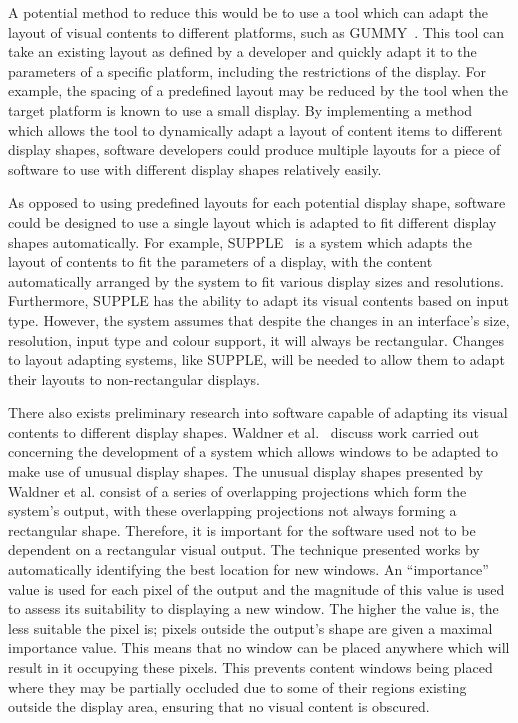 \documentclass[twocolumn,compsoc]{cvm}
\begin{document}
A potential method to reduce this would be to use a tool which can adapt the layout of visual contents to different platforms, such as GUMMY~\cite{Meskens2008}.
This tool can take an existing layout as defined by a developer and quickly adapt it to the parameters of a specific platform, including the restrictions of the display.
For example, the spacing of a predefined layout may be reduced by the tool when the target platform is known to use a small display.
By implementing a method which allows the tool to dynamically adapt a layout of content items to different display shapes, software developers could produce multiple layouts for a piece of software to use with different display shapes relatively easily.

As opposed to using predefined layouts for each potential display shape, software could be designed to use a single layout which is adapted to fit different display shapes automatically.
For example, SUPPLE~\cite{Gajos2004} is a system which adapts the layout of contents to fit the parameters of a display, with the content automatically arranged by the system to fit various display sizes and resolutions.
Furthermore, SUPPLE has the ability to adapt its visual contents based on input type.
However, the system assumes that despite the changes in an interface's size, resolution, input type and colour support, it will always be rectangular.
Changes to layout adapting systems, like SUPPLE, will be needed to allow them to adapt their layouts to non-rectangular displays.

There also exists preliminary research into software capable of adapting its visual contents to different display shapes.
Waldner et al.~\cite{Waldner2011} discuss work carried out concerning the development of a system which allows windows to be adapted to make use of unusual display shapes.
The unusual display shapes presented by Waldner et al. consist of a series of overlapping projections which form the system's output, with these overlapping projections not always forming a rectangular shape.
Therefore, it is important for the software used not to be dependent on a rectangular visual output.
The technique presented works by automatically identifying the best location for new windows.
An ``importance'' value is used for each pixel of the output and the magnitude of this value is used to assess its suitability to displaying a new window.
The higher the value is, the less suitable the pixel is; pixels outside the output's shape are given a maximal importance value.
This means that no window can be placed anywhere which will result in it occupying these pixels.
This prevents content windows being placed where they may be partially occluded due to some of their regions existing outside the display area, ensuring that no visual content is obscured.
\end{document}

